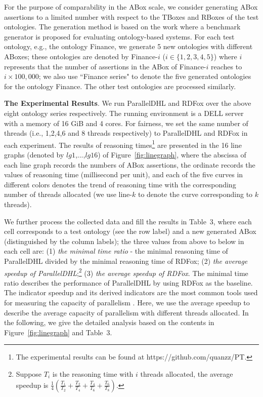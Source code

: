 \documentclass[final,1p,times]{elsarticle}
\begin{document}
For the purpose of comparability in the ABox scale, we consider generating ABox assertions
to a limited number with respect to the TBoxes and RBoxes of the test ontologies.
The generation method is based on the work \cite{Elhaik98} where a benchmark generator is proposed
for evaluating ontology-based systems.
For each test ontology, e.g., the ontology Finance, we generate 5 new ontologies with different ABoxes;
these ontologies are denoted by Finance-$i$ ($i\in\{1,2,3,4,5\}$) where $i$ represents that the number
of assertions in the ABox of Finance-$i$ reaches to $i\times100,000$;
we also use ``Finance series" to denote the five generated ontologies
for the ontology Finance. The other test ontologies are processed similarly.


\textbf{The Experimental Results}.
We run ParallelDHL and RDFox over the above eight ontology series respectively.
The running environment is a DELL server with a
memory of 16 GiB and 4 cores.
For fairness, we set the same number of threads (i.e., 1,2,4,6 and 8 threads respectively)
to ParallelDHL and RDFox in each experiment. The results of reasoning
times\footnote{The experimental results can be found at https://github.com/quanzz/PT.} are
presented in the 16 line graphs (denoted by $lg1$,...,$lg16$) of Figure~\ref{fig:linegraph},
where the abscissa of each line graph records the numbers of ABox assertions,
the ordinate records the values of reasoning time (millisecond per unit),
and each of the five curves in different colors denotes the trend of reasoning time with the
corresponding number of threads allocated (we use line-$k$ to denote the curve
corresponding to $k$ threads).

We further process the collected data and fill the results in Table~3, where each cell corresponds
to a test ontology (see the row label) and a new generated ABox (distinguished by the column labels);
the three values from above to below in each cell are: (1) \emph{the minimal time ratio} - the minimal reasoning time
of ParallelDHL divided by the minimal reasoning time of RDFox;
(2) \emph{the average speedup of ParallelDHL};\footnote{Suppose $T_i$ is the reasoning time with $i$ threads allocated,
the average speedup is $\frac{1}{4}(\frac{T_1}{T_2}+\frac{T_2}{T_4}+\frac{T_4}{T_6}+\frac{T_6}{T_8})$.}
(3) \emph{the average speedup of RDFox}.
The minimal time ratio describes the performance of ParallelDHL by using RDFox as the baseline.
The indicator speedup and its derived indicators are the most common tools used for measuring the capacity of parallelism \cite{MotikNPHO14,KazakovKS14,UrbaniKMHB12}.
Here, we use the average speedup \cite{ichiyoshiK92} to describe the average capacity of parallelism with different
threads allocated.
In the following, we give the detailed analysis based on the contents in Figure~\ref{fig:linegraph} and Table~3.
\end{document}
